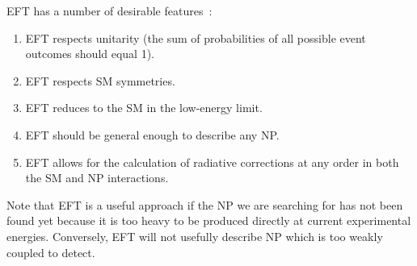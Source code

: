 EFT has a number of desirable features~\cite{DEGRANDE201321}:
\begin{enumerate}
  \item EFT respects unitarity (the sum of probabilities of all possible event
    outcomes should equal 1).
  \item EFT respects SM symmetries.
  \item EFT reduces to the SM in the low-energy limit.
  \item EFT should be general enough to describe any NP.
  \item EFT allows for the calculation of radiative corrections at any order in
    both the SM and NP interactions.
\end{enumerate}
Note that EFT is a useful approach if the NP we are searching for has not been
found yet because it is too heavy to be produced directly at current
experimental energies. Conversely, EFT will not usefully describe NP which is
too weakly coupled to detect.
